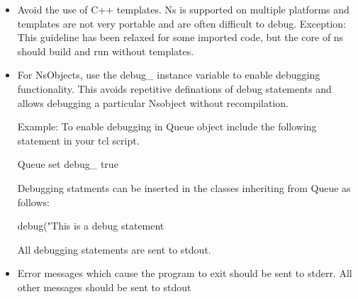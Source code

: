 \begin{itemize}
\item Avoid the use of C++ templates.
Ns is supported on multiple platforms and templates are not
very portable and are often difficult to debug.
Exception: This guideline has been relaxed for some imported code,
but the core of ns should build and run without templates.

\item For NsObjects, use the debug_ instance variable to enable debugging functionality.
This avoids repetitive definations of debug statements and allows debugging a particular
Nsobject without recompilation.

Example:
To enable debugging in Queue object include the following statement in your tcl script.
\begin{program}
	Queue set debug_ true
\end{program}

Debugging statments can be inserted in the classes inheriting from Queue as follows:

\begin{program}
	debug("This is a debug statement %
\end{program}

All debugging statements are sent to stdout.


\item Error messages which cause the program to exit should be sent to stderr.
All other messages should be sent to stdout
\end{itemize}
